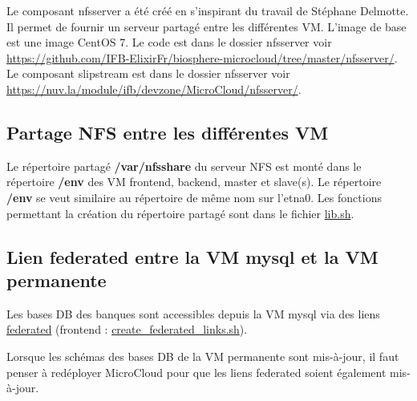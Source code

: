Le composant nfsserver a été créé en s'inspirant du travail de Stéphane Delmotte.
Il permet de fournir un serveur partagé entre les différentes VM.
L'image de base est une image CentOS 7.
Le code est dans le dossier nfsserver voir  \url{https://github.com/IFB-ElixirFr/biosphere-microcloud/tree/master/nfsserver/}.
Le composant slipstream est dans le dossier nfsserver voir
\url{https://nuv.la/module/ifb/devzone/MicroCloud/nfsserver/}.

\subsection{Partage NFS entre les différentes VM}

Le répertoire partagé \textbf{/var/nfsshare} du serveur NFS est monté dans le répertoire \textbf{/env}
des VM frontend, backend, master et slave(s).
Le répertoire \textbf{/env} se veut similaire au répertoire de même nom sur l’etna0. 
Les fonctions permettant la création du répertoire partagé sont dans le fichier \href{https://github.com/IFB-ElixirFr/biosphere-microcloud/blob/master/lib.sh}{lib.sh}.

\subsection{Lien federated entre la VM mysql et  la VM permanente}
Les bases DB des banques sont accessibles depuis la VM mysql via des liens \href{https://dev.mysql.com/doc/refman/8.0/en/federated-storage-engine.html}{federated} (frontend : \href{https://github.com/IFB-ElixirFr/biosphere-microcloud/blob/master/frontend/create_federated_links.sh}{create\_federated\_links.sh}).\\

\begin{mycolorbox}
	Lorsque les schémas des bases DB de la VM permanente sont mis-à-jour, il faut penser à redéployer MicroCloud pour que les liens federated soient également mis-à-jour.
\end{mycolorbox}

